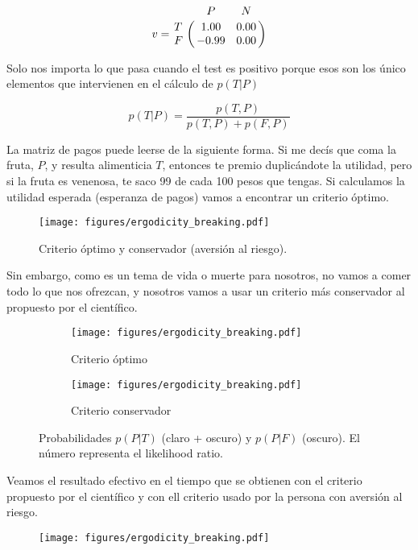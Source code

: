 \documentclass[a4paper,10pt]{article}
\begin{document}
\begin{equation}
 v = \bordermatrix{ & P & N  \cr
      T & 1.00 & 0.00  \cr
      F & -0.99 & 0.00  \cr} 
\end{equation}

Solo nos importa lo que pasa cuando el test es positivo porque esos son los \'unico elementos que intervienen en el c\'alculo de $p(T|P)$

\begin{equation}
 p(T|P) = \frac{p(T,P)}{p(T,P)+p(F,P)}
\end{equation}

La matriz de pagos puede leerse de la siguiente forma.
Si me dec\'is que coma la fruta, $P$, y resulta alimenticia $T$, entonces te premio duplicándote la utilidad, pero si la fruta es venenosa, te saco 99 de cada 100 pesos que tengas.
Si calculamos la utilidad esperada (esperanza de pagos) vamos a encontrar un criterio \'optimo.

\begin{figure}[H]
\centering
  \texttt{[image: figures/ergodicity\_breaking.pdf]}
  \caption{Criterio \'optimo y conservador (aversi\'on al riesgo).}
\end{figure}

Sin embargo, como es un tema de vida o muerte para nosotros, no vamos a comer todo lo que nos ofrezcan, y nosotros vamos a usar un criterio m\'as conservador al propuesto por el cient\'ifico.

\begin{figure}[H]
\centering
  \begin{subfigure}[t]{0.48\textwidth}
  \texttt{[image: figures/ergodicity\_breaking.pdf]}
  \caption{Criterio \'optimo}
  \end{subfigure}
  \begin{subfigure}[t]{0.48\textwidth}
  \texttt{[image: figures/ergodicity\_breaking.pdf]}
  \caption{Criterio conservador}
  \end{subfigure}
  \caption{Probabilidades $p(P|T)$ (claro + oscuro) y $p(P|F)$ (oscuro). El n\'umero representa el likelihood ratio.}
\end{figure}

Veamos el resultado efectivo en el tiempo que se obtienen con el criterio propuesto por el cient\'ifico y con ell criterio usado por la persona con aversión al riesgo. 

\begin{figure}[H]
\centering
  \texttt{[image: figures/ergodicity\_breaking.pdf]}
  \caption{}
\end{figure}
\end{document}
